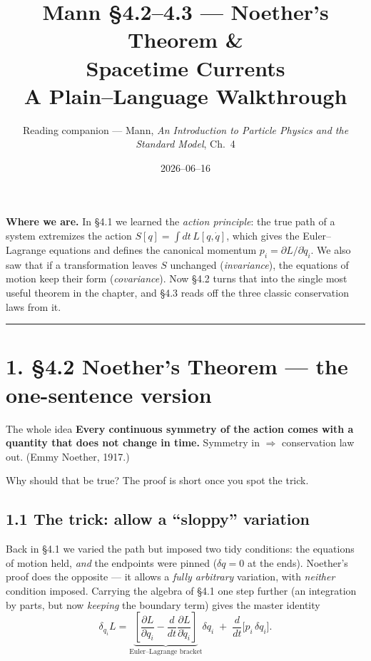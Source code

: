 \documentclass[11pt]{article}
\title{\textbf{Mann \S4.2--4.3 --- Noether's Theorem \&\\
Spacetime Currents}\\[2pt]
\large A Plain--Language Walkthrough}
\author{Reading companion --- Mann, \emph{An Introduction to Particle Physics
and the Standard Model}, Ch.~4}
\date{2026--06--16}
\newcommand{\dd}[2]{\frac{\partial #1}{\partial #2}}
\newcommand{\ddt}[1]{\frac{d#1}{dt}}
\begin{document}
\maketitle

\noindent\textbf{Where we are.} In \S4.1 we learned the \emph{action principle}:
the true path of a system extremizes the action $S[q]=\int dt\,L[q,\dot q]$,
which gives the Euler--Lagrange equations and defines the canonical momentum
$p_i=\partial L/\partial\dot q_i$. We also saw that if a transformation leaves
$S$ unchanged (\emph{invariance}), the equations of motion keep their form
(\emph{covariance}). Now \S4.2 turns that into the single most useful theorem
in the chapter, and \S4.3 reads off the three classic conservation laws from it.

\bigskip
\hrule
\bigskip

\section*{1. \S4.2 Noether's Theorem --- the one-sentence version}

\begin{keybox}{The whole idea}
\textbf{Every continuous symmetry of the action comes with a quantity that does
not change in time.} Symmetry in $\Rightarrow$ conservation law out. (Emmy
Noether, 1917.)
\end{keybox}

\noindent Why should that be true? The proof is short once you spot the trick.

\subsection*{1.1 The trick: allow a ``sloppy'' variation}

Back in \S4.1 we varied the path but imposed two tidy conditions: the
equations of motion held, \emph{and} the endpoints were pinned ($\delta q=0$ at
the ends). Noether's proof does the opposite --- it allows a \emph{fully
arbitrary} variation, with \emph{neither} condition imposed. Carrying the
algebra of \S4.1 one step further (an integration by parts, but now \emph{keeping}
the boundary term) gives the master identity
\begin{equation}
\delta_{q_i} L
= \underbrace{\left[\dd{L}{q_i}-\ddt{}\dd{L}{\dot q_i}\right]}_{\text{Euler--Lagrange bracket}}\delta q_i
\;+\; \ddt{}\big[p_i\,\delta q_i\big].
\label{eq:master}
\end{equation}
\end{document}
